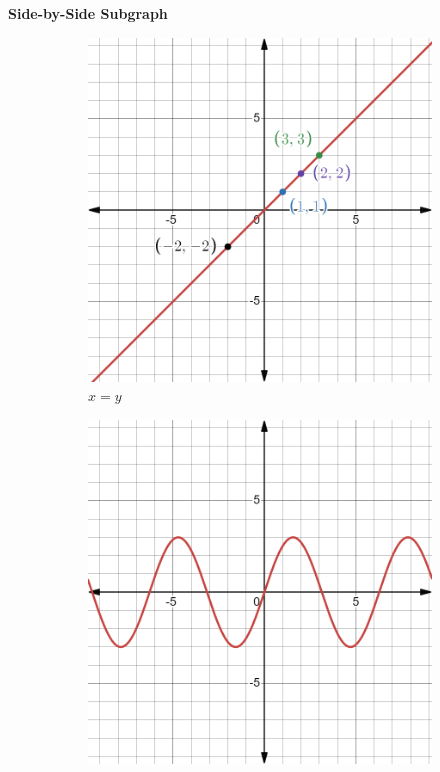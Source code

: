 \documentclass{article}
\begin{document}
\begin{center}
\textbf{\huge Side-by-Side Subgraph}
\end{center}
\begin{figure}[ht]
\centering
	\begin{subfigure}[c]{0.3\textwidth}
	   \centering
	   \includegraphics[width=\textwidth]{x=y.png}
            \caption{$x=y$}
	\end{subfigure}
 \hfill 	
	\begin{subfigure}[c]{0.3\textwidth}
	   \centering
	   \includegraphics[width=\textwidth]{y=3sinx.png}

\end{subfigure}
\end{figure}
\end{document}
